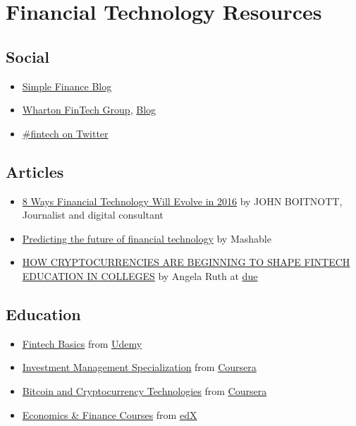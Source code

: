 \documentclass[]{book}
\providecommand{\tightlist}{%
  \setlength{\itemsep}{0pt}\setlength{\parskip}{0pt}}
\begin{document}
\section{Financial Technology
Resources}\label{financial-technology-resources}

\subsection{Social}\label{social}

\begin{itemize}
\tightlist
\item
  \href{https://www.simple.com/blog}{Simple Finance Blog}
\item
  \href{https://medium.com/wharton-fintech}{Wharton FinTech Group},
  \href{https://medium.com/wharton-fintech}{Blog}
\item
  \href{https://twitter.com/hashtag/fintech?lang=en}{\#fintech on
  Twitter}
\end{itemize}

\subsection{Articles}\label{articles}

\begin{itemize}
\tightlist
\item
  \href{http://www.inc.com/john-boitnott/8-ways-financial-technology-is-changing-in-2016.html}{8
  Ways Financial Technology Will Evolve in 2016} by JOHN BOITNOTT,
  Journalist and digital consultant
\item
  \href{http://mashable.com/2016/01/27/financial-tech-brandspeak/\#ooPFUtwIakqa}{Predicting
  the future of financial technology} by Mashable
\item
  \href{https://due.com/blog/how-cryptocurrencies-are-beginning-to-shape-fintech-education-in-colleges/}{HOW
  CRYPTOCURRENCIES ARE BEGINNING TO SHAPE FINTECH EDUCATION IN COLLEGES}
  by Angela Ruth at \href{https://due.com/}{due}
\end{itemize}

\subsection{Education}\label{education}

\begin{itemize}
\tightlist
\item
  \href{https://www.udemy.com/fintech-basics/}{Fintech Basics} from
  \href{https://www.udemy.com/}{Udemy}
\item
  \href{https://www.coursera.org/specializations/investment-management}{Investment
  Management Specialization} from
  \href{https://www.coursera.org/}{Coursera}
\item
  \href{https://www.coursera.org/learn/cryptocurrency}{Bitcoin and
  Cryptocurrency Technologies} from
  \href{https://www.coursera.org/}{Coursera}
\item
  \href{https://www.edx.org/course/subject/economics-finance}{Economics
  \& Finance Courses} from \href{https://www.edx.org}{edX}
\end{itemize}


\end{document}
